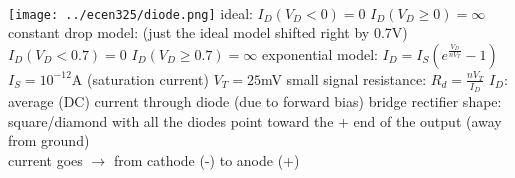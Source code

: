 \documentclass[12pt]{article}
\begin{document}
\begin{spacing}{0.8}
\begin{multicols*}{2}
\begin{flushleft}
\begin{outline}[longenum]

\\\vspace{-40px}
\hfill\texttt{[image: ../ecen325/diode.png]}
\vspace{-20px}
  \1 ideal:
    \2 $I_D(V_D <    0) = 0$
    \2 $I_D(V_D \geq 0) = \infty$
  \1 constant drop model: (just the ideal model shifted right by 0.7V)
    \2 $I_D(V_D <    0.7) = 0$
    \2 $I_D(V_D \geq 0.7) = \infty$
  \1 exponential model: $I_D = I_S ( e^{\frac{V_D}{n V_T}} - 1 )$
    \2 $I_S=10^{-12}$A (saturation current)
    \2 $V_T=25$mV
  \1 small signal resistance: $R_d = \frac{nV_T}{I_D}$
    \2 $I_D$: average (DC) current through diode (due to forward bias)
  \1 bridge rectifier shape: square/diamond with all the diodes point toward the + end of the output (away from ground)
  \\ current goes $\rightarrow$ from cathode (-) to anode (+)


\end{outline}
\end{flushleft}
\end{multicols*}
\end{spacing}
\end{document}
